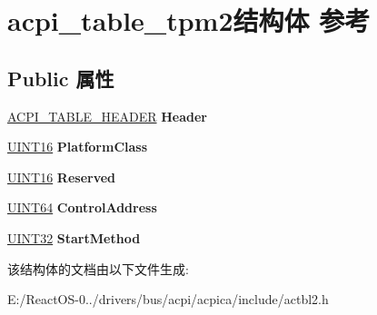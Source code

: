 \hypertarget{structacpi__table__tpm2}{}\section{acpi\+\_\+table\+\_\+tpm2结构体 参考}
\label{structacpi__table__tpm2}
\subsection*{Public 属性}
\begin{DoxyCompactItemize}
\item 
\mbox{\label{structacpi__table__tpm2_a33eb52ae979f3206e7a2412ae5d2275e}} 
\hyperlink{structacpi__table__header}{A\+C\+P\+I\+\_\+\+T\+A\+B\+L\+E\+\_\+\+H\+E\+A\+D\+ER} {\bfseries Header}
\item 
\mbox{\label{structacpi__table__tpm2_aff5f71135154d96a32620aa2a39a9abe}} 
\hyperlink{_processor_bind_8h_a09f1a1fb2293e33483cc8d44aefb1eb1}{U\+I\+N\+T16} {\bfseries Platform\+Class}
\item 
\mbox{\label{structacpi__table__tpm2_a0be643364ed9070c3f6db8aab9b97053}} 
\hyperlink{_processor_bind_8h_a09f1a1fb2293e33483cc8d44aefb1eb1}{U\+I\+N\+T16} {\bfseries Reserved}
\item 
\mbox{\label{structacpi__table__tpm2_a44f7d48891c77292732b43c9163be718}} 
\hyperlink{_processor_bind_8h_a57be03562867144161c1bfee95ca8f7c}{U\+I\+N\+T64} {\bfseries Control\+Address}
\item 
\mbox{\label{structacpi__table__tpm2_af1d366159ad21b9f74423665644fed3b}} 
\hyperlink{_processor_bind_8h_ae1e6edbbc26d6fbc71a90190d0266018}{U\+I\+N\+T32} {\bfseries Start\+Method}
\end{DoxyCompactItemize}


该结构体的文档由以下文件生成\+:\begin{DoxyCompactItemize}
\item 
E\+:/\+React\+O\+S-\/0../drivers/bus/acpi/acpica/include/actbl2.\+h\end{DoxyCompactItemize}

